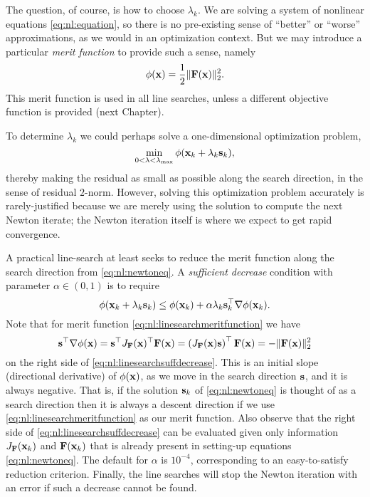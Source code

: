 The question, of course, is how to choose $\lambda_k$.  We are solving a system of nonlinear equations \eqref{eq:nl:equation}, so there is no pre-existing sense of ``better'' or ``worse'' approximations, as we would in an optimization context.  But we may introduce a particular \emph{merit function} \citep{NocedalWright2006} to provide such a sense, namely
\begin{equation}
\phi(\mathbf{x}) = \frac{1}{2} \|\mathbf{F}(\mathbf{x})\|_2^2.  \label{eq:nl:linesearchmeritfunction}
\end{equation}
This merit function is used in all \pSNES line searches, unless a different objective function is provided (next Chapter).

To determine $\lambda_k$ we could perhaps solve a one-dimensional optimization problem,
\begin{equation}
\min_{0<\lambda<\lambda_{\text{max}}} \phi(\mathbf{x}_k + \lambda_k \mathbf{s}_k),  \label{eq:nl:linesearchperhapsopt}
\end{equation}
thereby making the residual as small as possible along the search direction, in the sense of residual $2$-norm.  However, solving this optimization problem accurately is rarely-justified because we are merely using the solution to compute the next Newton iterate; the Newton iteration itself is where we expect to get rapid convergence.

A practical line-search at least seeks to reduce the merit function along the search direction from \eqref{eq:nl:newtoneq}.  A \emph{sufficient  decrease} condition with parameter $\alpha\in(0,1)$ is to require
\begin{equation}
\phi(\mathbf{x}_k + \lambda_k \mathbf{s}_k) \le \phi(\mathbf{x}_k) + \alpha \lambda_k \mathbf{s}_k^\top \nabla \phi(\mathbf{x}_k).  \label{eq:nl:linesearchsuffdecrease}
\end{equation}
Note that for merit function \eqref{eq:nl:linesearchmeritfunction} we have
\begin{equation}
\mathbf{s}^\top \nabla \phi(\mathbf{x}) = \mathbf{s}^\top J_{\mathbf{F}}(\mathbf{x})^\top \mathbf{F}(\mathbf{x}) = \left(J_{\mathbf{F}}(\mathbf{x}) \mathbf{s}\right)^\top \mathbf{F}(\mathbf{x}) = - \|\mathbf{F}(\mathbf{x})\|_2^2 \label{eq:nl:linesearchinitslope}
\end{equation}
on the right side of \eqref{eq:nl:linesearchsuffdecrease}.  This is an initial slope (directional derivative) of $\phi(\mathbf{x})$, as we move in the search direction $\mathbf{s}$, and it is always negative.  That is, if the solution $\mathbf{s}_k$ of \eqref{eq:nl:newtoneq} is thought of as a search direction then it is always a descent direction if we use \eqref{eq:nl:linesearchmeritfunction} as our merit function.  Also observe that the right side of \eqref{eq:nl:linesearchsuffdecrease} can be evaluated given only information $J_{\mathbf{F}}(\mathbf{x}_k)$ and $\mathbf{F}(\mathbf{x}_k)$ that is already present in setting-up equations \eqref{eq:nl:newtoneq}.  The \PETSc default for $\alpha$ is $10^{-4}$, corresponding to an easy-to-satisfy reduction criterion.  Finally, the \PETSc line searches will stop the Newton iteration with an error if such a decrease cannot be found.

